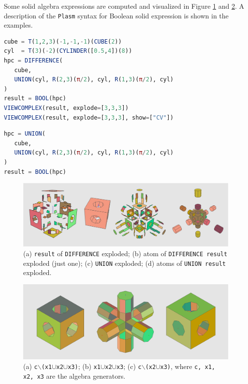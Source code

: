 \documentclass{juliacon}
\begin{document}
	Some solid algebra expressions are computed and visualized in Figure \ref{fig:mech-2-diff} and \ref{fig:mech-2-union}. A description of the {\tt Plasm} syntax for Boolean solid expression is shown in the examples.

\begin{lstlisting}[language = Julia,numbers=none,label={lst:exmpl10},
caption={Plasm expression of its Boolean solid algebra. Shown in Figure \ref{fig:mech-2-diff}}
]
cube = T(1,2,3)(-1,-1,-1)(CUBE(2))
cyl  = T(3)(-2)(CYLINDER([0.5,4])(8))
hpc = DIFFERENCE( 
   cube, 
   UNION(cyl, R(2,3)(π/2), cyl, R(1,3)(π/2), cyl)
)
result = BOOL(hpc)
VIEWCOMPLEX(result, explode=[3,3,3])
VIEWCOMPLEX(result, explode=[3,3,3], show=["CV"])
\end{lstlisting}

\begin{lstlisting}[language = Julia,numbers=none,label={lst:exmpl10},
caption={Plasm expression of its Boolean solid algebra. Shown in Figure \ref{fig:mech-2-union}}
]
hpc = UNION( 
   cube, 
   UNION(cyl, R(2,3)(π/2), cyl, R(1,3)(π/2), cyl)
)
result = BOOL(hpc)
\end{lstlisting}

	\begin{figure}[h]
		\centering
		\includegraphics[width=0.95\linewidth]{figs/difference}%
		\caption{(a) {\tt result} of {\tt DIFFERENCE} exploded; (b) atom of {\tt DIFFERENCE result} exploded (just one); (c) {\tt UNION} exploded; (d) atoms of {\tt UNION result} exploded.}
		\label{fig:mech-2-diff}
	\end{figure}

	\begin{figure}[h]
		\centering
		\includegraphics[width=0.95\linewidth]{figs/threecubes}%
		\caption{(a) {\tt c$\backslash$(x1$\cup$x2$\cup$x3)}; (b) {\tt x1$\cup$x2$\cup$x3}; (c) {\tt c$\backslash$(x2$\cup$x3)}, where {\tt c, x1, x2, x3} are the algebra generators.}
		\label{fig:mech-2-union}
	\end{figure}
\end{document}

